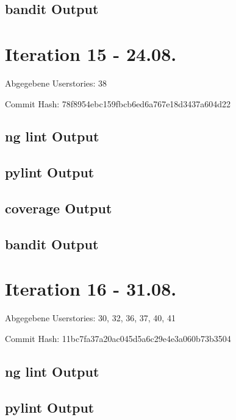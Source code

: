 \documentclass[accentcolor=tud0b,12pt,paper=a4]{tudreport}
\begin{document}
	\subsection*{bandit Output}
	

\section*{Iteration 15 - 24.08.}
	Abgegebene Userstories: 38
	
	Commit Hash: 78f8954ebc159fbcb6ed6a767e18d3437a604d22
	
	\subsection*{ng lint Output}
	
	
	\subsection*{pylint Output}
	
	
	\subsection*{coverage Output}
	
	
	\subsection*{bandit Output}
	

\section*{Iteration 16 - 31.08.} 
	Abgegebene Userstories: 30, 32, 36, 37, 40, 41
	
	Commit Hash: 11bc7fa37a20ac045d5a6c29e4e3a060b73b3504
	
	\subsection*{ng lint Output}
	
	
	\subsection*{pylint Output}
	
	
\end{document}
